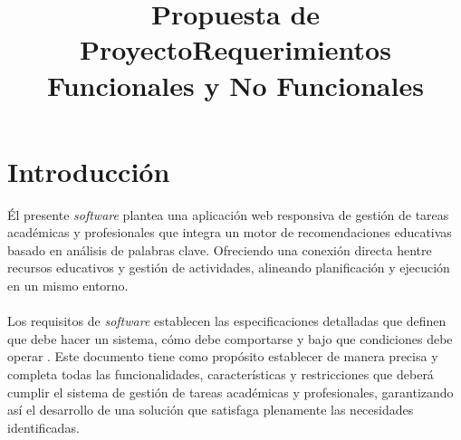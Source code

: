 \documentclass[11pt]{article}
\title{Propuesta de Proyecto}
\title{Requerimientos Funcionales y No Funcionales}
\begin{document}

                                                     

\tableofcontents 
\pagebreak



\section{Introducción}
Él presente \textit{software} plantea una aplicación web responsiva de gestión de tareas académicas y profesionales que integra
 un motor de recomendaciones educativas basado en análisis de palabras clave. Ofreciendo una conexión directa hentre recursos educativos y 
 gestión de actividades, alineando planificación y ejecución en un mismo entorno.\\\\
 Los requisitos de \textit{software} establecen las especificaciones detalladas que definen que debe hacer un sistema, cómo debe 
 comportarse y bajo que condiciones debe operar \autocite{Requirements2024}. Este documento  tiene como propósito establecer de
 manera precisa y completa todas las funcionalidades, características y restricciones que deberá cumplir el sistema de gestión de
 tareas académicas y profesionales, garantizando así el desarrollo de una solución que satisfaga plenamente las necesidades identificadas.
 \\\\
 
\vspace{0.7cm}
\end{document}

